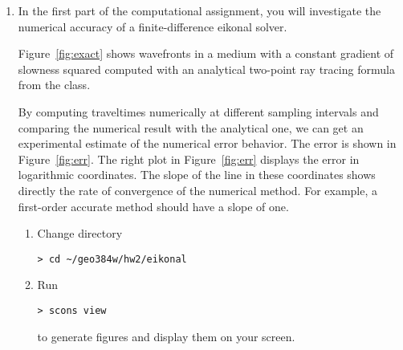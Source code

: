 \begin{enumerate}

\item In the first part of the computational assignment, you will
  investigate the numerical accuracy of a finite-difference eikonal solver.


\lstset{language=python,numbers=left,numberstyle=\tiny,showstringspaces=false}


  Figure~\ref{fig:exact} shows wavefronts in a medium with a constant
  gradient of slowness squared computed with an analytical two-point
  ray tracing formula from the class.
 

  By computing traveltimes numerically at different sampling intervals
  and comparing the numerical result with the analytical one, we can
  get an experimental estimate of the numerical error behavior. The
  error is shown in Figure~\ref{fig:err}. The right plot in
  Figure~\ref{fig:err} displays the error in logarithmic coordinates. The
  slope of the line in these coordinates shows directly the rate of
  convergence of the numerical method. For example, a first-order
  accurate method should have a slope of one.


  \begin{enumerate}
  \item Change directory
\begin{verbatim}
> cd ~/geo384w/hw2/eikonal
\end{verbatim}
  \item Run
\begin{verbatim}
> scons view
\end{verbatim}
    to generate figures and display them on your screen.  


\end{enumerate}
\end{enumerate}
